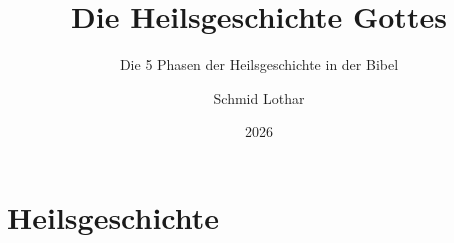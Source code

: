 \documentclass[fontsize=12pt]{mybibreport}
\title{Die Heilsgeschichte Gottes}
\subtitle{Die 5 Phasen der Heilsgeschichte in der Bibel}
\author{Schmid Lothar}
\date{2026}
\begin{document}
    \mytitlepage

    \tableofcontents

    \chapter{Heilsgeschichte}

    
    
    
    
    
    
    
\end{document}
